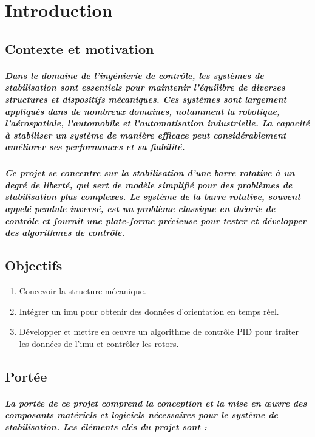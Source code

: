 \chapter{Introduction}
\label{cp:introduction}


\section{Contexte et motivation}
\paragraph{Dans le domaine de l'ingénierie de contrôle, les systèmes de stabilisation sont essentiels pour maintenir l'équilibre de diverses structures et dispositifs mécaniques. Ces systèmes sont largement appliqués dans de nombreux domaines, notamment la robotique, l'aérospatiale, l'automobile et l'automatisation industrielle. La capacité à stabiliser un système de manière efficace peut considérablement améliorer ses performances et sa fiabilité.}
\paragraph{Ce projet se concentre sur la stabilisation d'une barre rotative à un degré de liberté, qui sert de modèle simplifié pour des problèmes de stabilisation plus complexes. Le système de la barre rotative, souvent appelé pendule inversé, est un problème classique en théorie de contrôle et fournit une plate-forme précieuse pour tester et développer des algorithmes de contrôle.}

\section{Objectifs}
\begin{enumerate}
	\item Concevoir la structure mécanique.
	\item Intégrer un \gls{imu} pour obtenir des données d'orientation en temps réel.
	\item Développer et mettre en œuvre un algorithme de contrôle PID pour traiter les données de l'\gls{imu} et contrôler les rotors.
\end{enumerate}

\section{Portée}

\paragraph{La portée de ce projet comprend la conception et la mise en œuvre des composants matériels et logiciels nécessaires pour le système de stabilisation. Les éléments clés du projet sont :}


